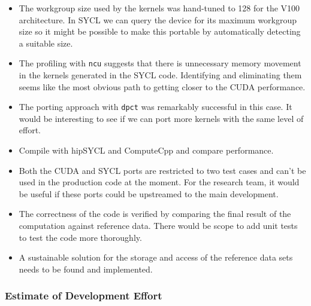 \documentclass[../main]{subfiles}
\begin{document}
\begin{itemize}
	\item The workgroup size used by the kernels was hand-tuned to 128 for the V100 architecture. In SYCL we can query the device for its maximum workgroup size so it might be possible to make this portable by automatically detecting a suitable size.
	\item The profiling with \verb #ncu# suggests that there is unnecessary memory movement in the kernels generated in the SYCL code. Identifying and eliminating them seems like the most obvious path to getting closer to the CUDA performance.
	\item The porting approach with \verb #dpct# was remarkably successful in this case. It would be interesting to see if we can port more kernels with the same level of effort.
	\item Compile with hipSYCL and ComputeCpp and compare performance.
	\item Both the CUDA and SYCL ports are restricted to two test cases and can't be used in the production code at the moment. For the research team, it would be useful if these ports could be upstreamed to the main development.
	\item The correctness of the code is verified by comparing the final result of the computation against reference data. There would be scope to add unit tests to test the code more thoroughly.
	\item A sustainable solution for the storage and access of the reference data sets needs to be found and implemented. 
\end{itemize}

\subsubsection{Estimate of Development Effort}\label{sec:openqcd_personhours}
\end{document}
